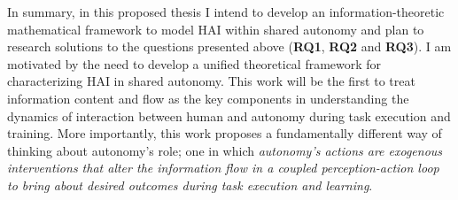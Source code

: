 \documentclass[12pt]{article}
\newcommand{\POINTS}[1]{{\textbf{\color{red}{#1}}}}
\begin{document}
In summary, in this proposed thesis I intend to develop an information-theoretic mathematical framework to model HAI within shared autonomy and plan to research solutions to the questions presented above (\textbf{RQ1}, \textbf{RQ2} and \textbf{RQ3}). I am motivated by the need to develop a unified theoretical framework for characterizing HAI in shared autonomy. This work will be the first to treat information content and flow as the key components in understanding the dynamics of interaction between human and autonomy during task execution and training. More importantly, this work proposes a fundamentally different way of thinking about autonomy's role; one in which \textit{autonomy's actions are exogenous interventions that alter the information flow in a coupled perception-action loop to bring about desired outcomes during task execution and learning}.



%


\end{document}
